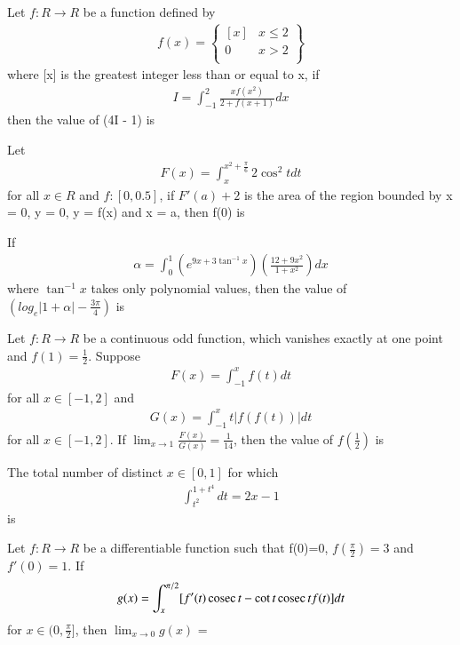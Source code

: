 \item Let $f: R \to R$ be a function defined by 
\begin{align*}
f(x) = 
\left\lbrace
\begin{array}{ll}
      [x] & x \leq 2\\
      0 & x > 2\\
\end{array}
\right\rbrace
\end{align*}
where [x] is the greatest integer less than or equal to x, if 
\begin{align*}
I = \int_{-1}^{2}\frac{xf(x^2)}{2 + f(x + 1)}dx
\end{align*}
then the value of (4I - 1) is

\item Let 
\begin{align*}
F(x) = \int_{x}^{x^2 + \frac{\pi}{6}}2\cos^{2}t dt
\end{align*}
for all $x \in R$ and $f: [0, 0.5]$, if $F'(a) + 2$ is the area of the region bounded by x = 0, y = 0, y = f(x) and x = a, then f(0) is

\item If 
\begin{align*}
\alpha = \int_{0}^{1}(e^{9x + 3\tan^{-1}x})\left(\frac{12 + 9x^2}{1 + x^2}\right)dx
\end{align*}
where $\tan^{-1}x$ takes only polynomial values, then the value of $\left( log_e|1 + \alpha| - \frac{3\pi}{4}\right)$ is

\item Let $f: R \to R$ be a continuous odd function, which vanishes exactly at one point and $f(1) = \frac{1}{2}$. Suppose 
\begin{align*}
F(x) = \int_{-1}^{x}f(t)dt
\end{align*}
for all $x \in [-1, 2]$  and
\begin{align*}
G(x) = \int_{-1}^{x}t|f(f(t))|dt
\end{align*}
for all $x \in [-1, 2]$. If $\lim_{x \to 1}\frac{F(x)}{G(x)} = \frac{1}{14}$, then the value of $f(\frac{1}{2})$ is

\item The total number of distinct $x \in [0, 1]$ for which 
\begin{align*}
\int_{t^2}^{1 + t^4}dt = 2x - 1
\end{align*}
is

\item Let $f: R \to R$ be a differentiable function such that f(0)=0, $f(\frac{\pi}{2}) = 3$ and $f'(0) = 1$. If
\begin{align*}
g(x)  = \int_{x}^{\pi/2}[f'(t)\,\text{cosec}\, t - \cot t \,\text{cosec}\, t f(t)]dt
\end{align*}
for $x \in (0, \frac{\pi}{2}]$, then $\lim_{x \to 0}g(x)$ =

